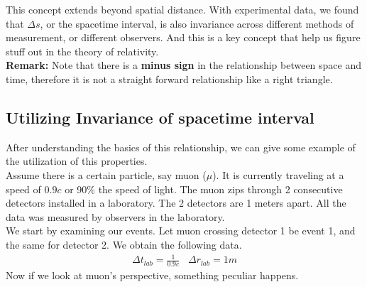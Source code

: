 \documentclass[11pt,letterpaper]{book}
\begin{document}
This concept extends beyond spatial distance. With experimental data, we found that $\Delta s$, or the spacetime interval, is also invariance across different methods of measurement, or different observers. And this is a key concept that help us figure stuff out in the theory of relativity. \\

\textbf{Remark: }Note that there is a \textbf{minus sign} in the relationship between space and time, therefore it is not a straight forward relationship like a right triangle.

\subsection{Utilizing Invariance of spacetime interval}
After understanding the basics of this relationship, we can give some example of the utilization of this properties.\\

Assume there is a certain particle, say muon ($\mu$). It is currently traveling at a speed of $0.9c$ or 90\% the speed of light. The muon zips through 2 consecutive detectors installed in a laboratory. The 2 detectors are 1 meters apart. All the data was measured by observers in the laboratory. \\

We start by examining our events. Let muon crossing detector 1 be event 1, and the same for detector 2. We obtain the following data.
\begin{align}
\Delta t_{lab} = \frac{1}{0.9c} \;\;\; \Delta r_{lab} = 1m
\end{align}
Now if we look at muon's perspective, something peculiar happens. \\
 
\end{document}
